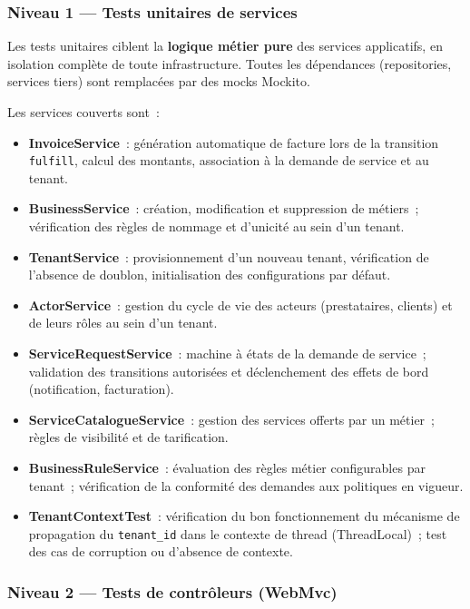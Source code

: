 \subsubsection*{Niveau 1 — Tests unitaires de services}

Les tests unitaires ciblent la \textbf{logique métier pure} des services applicatifs, en
isolation complète de toute infrastructure. Toutes les dépendances (repositories,
services tiers) sont remplacées par des mocks Mockito.

Les services couverts sont~:

\begin{itemize}
  \item \textbf{InvoiceService}~: génération automatique de facture lors de la transition
        \texttt{fulfill}, calcul des montants, association à la demande de service et au
        tenant.
  \item \textbf{BusinessService}~: création, modification et suppression de métiers~;
        vérification des règles de nommage et d'unicité au sein d'un tenant.
  \item \textbf{TenantService}~: provisionnement d'un nouveau tenant, vérification de
        l'absence de doublon, initialisation des configurations par défaut.
  \item \textbf{ActorService}~: gestion du cycle de vie des acteurs (prestataires, clients)
        et de leurs rôles au sein d'un tenant.
  \item \textbf{ServiceRequestService}~: machine à états de la demande de service~;
        validation des transitions autorisées et déclenchement des effets de bord
        (notification, facturation).
  \item \textbf{ServiceCatalogueService}~: gestion des services offerts par un métier~;
        règles de visibilité et de tarification.
  \item \textbf{BusinessRuleService}~: évaluation des règles métier configurables par
        tenant~; vérification de la conformité des demandes aux politiques en vigueur.
  \item \textbf{TenantContextTest}~: vérification du bon fonctionnement du mécanisme de
        propagation du \texttt{tenant\_id} dans le contexte de thread (ThreadLocal)~; test
        des cas de corruption ou d'absence de contexte.
\end{itemize}

\subsubsection*{Niveau 2 — Tests de contrôleurs (WebMvc)}

